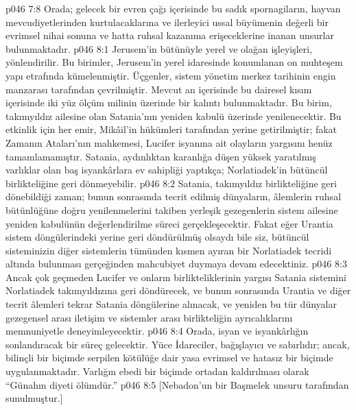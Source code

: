 \vs p046 7:8 Orada; gelecek bir evren çağı içerisinde bu sadık spornagiların, hayvan mevcudiyetlerinden kurtulacaklarına ve ilerleyici ussal büyümenin değerli bir evrimsel nihai sonuna ve hatta ruhsal kazanıma erişeceklerine inanan unsurlar bulunmaktadır.
\vs p046 8:1 Jerusem’in bütünüyle yerel ve olağan işleyişleri,  yönlendirilir. Bu birimler, Jerusem’in yerel idaresinde konumlanan on muhteşem yapı etrafında kümelenmiştir. Üçgenler, sistem yönetim merkez tarihinin engin manzarası tarafından çevrilmiştir. Mevcut an içerisinde bu dairesel kısım içerisinde iki yüz ölçüm milinin üzerinde bir kalıntı bulunmaktadır. Bu birim, takımyıldız ailesine olan Satania’nın yeniden kabulü üzerinde yenilenecektir. Bu etkinlik için her emir, Mikâil’in hükümleri tarafından yerine getirilmiştir; fakat Zamanın Ataları’nın mahkemesi, Lucifer isyanına ait olayların yargısını henüz tamamlamamıştır. Satania, aydınlıktan karanlığa düşen yüksek yaratılmış varlıklar olan baş isyankârlara ev sahipliği yaptıkça; Norlatiadek’in bütüncül birlikteliğine geri dönmeyebilir.
\vs p046 8:2 Satania, takımyıldız birlikteliğine geri dönebildiği zaman; bunun sonrasında tecrit edilmiş dünyaların, âlemlerin ruhsal bütünlüğüne doğru yenilenmelerini takiben yerleşik gezegenlerin sistem ailesine yeniden kabulünün değerlendirilme süreci gerçekleşecektir. Fakat eğer Urantia sistem döngülerindeki yerine geri döndürülmüş olsaydı bile siz, bütüncül sisteminizin diğer sistemlerin tümünden kısmen ayıran bir Norlatiadek tecridi altında bulunması gerçeğinden mahcubiyet duymaya devam edecektiniz.
\vs p046 8:3 Ancak çok geçmeden Lucifer ve onların birlikteliklerinin yargısı Satania sistemini Norlatiadek takımyıldızına geri döndürecek, ve bunun sonrasında Urantia ve diğer tecrit âlemleri tekrar Satania döngülerine alınacak, ve yeniden bu tür dünyalar gezegensel arası iletişim ve sistemler arası birlikteliğin ayrıcalıklarını memnuniyetle deneyimleyecektir.
\vs p046 8:4 Orada, isyan ve isyankârlığın sonlandıracak bir süreç gelecektir. Yüce İdareciler, bağışlayıcı ve sabırlıdır; ancak, bilinçli bir biçimde serpilen kötülüğe dair yasa evrimsel ve hatasız bir biçimde uygulanmaktadır. Varlığın ebedi bir biçimde ortadan kaldırılması olarak “Günahın diyeti ölümdür.”
\vs p046 8:5 [Nebadon’un bir Başmelek unsuru tarafından sunulmuştur.]
